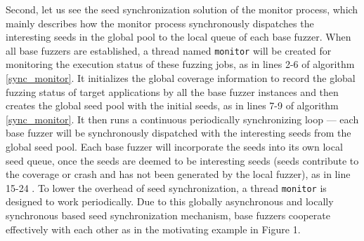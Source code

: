 Second, let us see the seed synchronization solution of the monitor process, which mainly describes how the monitor process synchronously dispatches the interesting seeds in the global pool to the local queue of each base fuzzer.
When all base fuzzers are established, a thread named \texttt{monitor} will be created for monitoring the execution status of these fuzzing jobs, as in lines 2-6 of algorithm \ref{sync_monitor}. It initializes the global coverage information to record the global fuzzing status of target applications by all the base fuzzer instances and then creates the global seed pool with the initial seeds, as in lines 7-9 of algorithm \ref{sync_monitor}. It then runs a continuous periodically synchronizing loop --- each base fuzzer will be synchronously dispatched with the interesting seeds from the global seed pool. Each base fuzzer will incorporate the seeds into its own local seed queue, once the seeds are deemed to be interesting seeds (seeds contribute to the coverage or crash and has not been generated by the local fuzzer), as in line 15-24 .
To lower the overhead of seed synchronization, a thread \texttt{monitor} is designed to work periodically. Due to this globally asynchronous and locally synchronous based seed synchronization mechanism, base fuzzers cooperate effectively with each other as in the motivating example in Figure 1.







%
%
%

